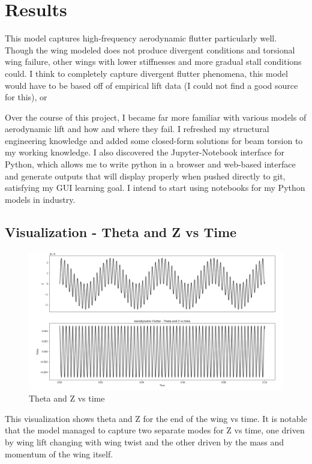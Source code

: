 \documentclass[]{article}
\begin{document}
\section{Results}

This model captures high-frequency aerodynamic flutter particularly well. Though the wing modeled does not produce divergent conditions and torsional wing failure, other wings with lower stiffnesses and more gradual stall conditions could. I think to completely capture divergent flutter phenomena, this model would have to be based off of empirical lift data (I could not find a good source for this), or 

Over the course of this project, I became far more familiar with various models of aerodynamic lift and how and where they fail.  I refreshed my structural engineering knowledge and added some closed-form solutions for beam torsion to my working knowledge. I also discovered the Jupyter-Notebook interface for Python, which allows me to write python in a browser and web-based interface and generate outputs that will display properly when pushed directly to git, satisfying my GUI learning goal. I intend to start using notebooks for my Python models in industry. 

\subsection{Visualization - Theta and Z vs Time}


\begin{figure}[H]
	\includegraphics[width=12cm]{flutterplot}
	\centering
	\caption{Theta and Z vs time}
\end{figure}

This visualization shows theta and Z for the end of the wing vs time. It is notable that the model managed to capture two separate modes for Z vs time, one driven by wing lift changing with wing twist and the other driven by the mass and momentum of the wing itself.
\end{document}
